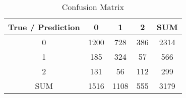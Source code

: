 \begin{table}[!ht]
    \centering
    \caption{Confusion Matrix}
    \label{tbl:performance_results}
    \begin{tabular}{|c|c|c|c|c|}
        \hline True / Prediction  & 0 & 1 & 2 & SUM\\
        \hline 0 & 1200 & 728 & 386 & 2314\\
        \hline 1 & 185 & 324 & 57 & 566\\
        \hline 2 & 131 & 56 & 112 & 299\\
        \hline SUM & 1516 & 1108 & 555 & 3179\\
        \hline
    \end{tabular}
\end{table}